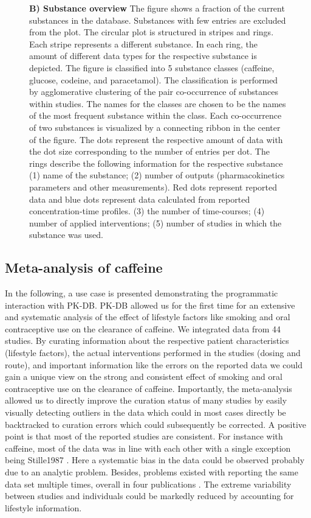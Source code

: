 \documentclass[a4,center,fleqn]{NAR}
\begin{document}
\begin{figure}[t]
{\textbf{ B) Substance overview} The figure shows a fraction of the current substances in the database. Substances with few entries are excluded from the plot. The circular plot is structured in stripes and rings. Each stripe represents a different substance. In each ring, the amount of different data types for the respective substance is depicted. The figure is classified into 5 substance classes (caffeine, glucose, codeine, and paracetamol). The classification is performed by agglomerative clustering of the pair co-occurrence of substances within studies. The names for the classes are chosen to be the names of the most frequent substance within the class. Each co-occurrence of two substances is visualized by a connecting ribbon in the center of the figure. The dots represent the respective amount of data with the dot size corresponding to the number of entries per dot. The rings describe the following information for the respective substance (1) name of the substance; (2) number of outputs (pharmacokinetics parameters and other measurements). Red dots represent reported data and blue dots represent data calculated from reported concentration-time profiles. (3) the number of time-courses; (4) number of applied interventions; (5) number of studies in which the substance was used.
}
\label{NAR-fig3}
\end{figure}

\subsection{Meta-analysis of caffeine}
In the following, a use case is presented demonstrating the programmatic interaction with PK-DB.
PK-DB allowed us for the first time for an extensive and systematic analysis of the effect of lifestyle factors like smoking and oral contraceptive use on the clearance of caffeine. We integrated data from 44 studies. By curating information about the respective patient characteristics (lifestyle factors), the actual interventions performed in the studies (dosing and route), and important information like the errors on the reported data we could gain a unique view on the strong and consistent effect of smoking and oral contraceptive use on the clearance of caffeine. 
Importantly, the meta-analysis allowed us to directly improve the curation status of many studies by easily visually detecting outliers in the data which could in most cases directly be backtracked to curation errors which could subsequently be corrected. 
A positive point is that most of the reported studies are consistent. For instance with caffeine, most of the data was in line with each other with a single exception being Stille1987 \cite{Stille1987}. Here a systematic bias in the data could be observed probably due to an analytic problem. Besides, problems existed with reporting the same data set multiple times, overall in four publications \cite{Stille1987, Harder1988, Harder1989, Balogh1992}. The extreme variability between studies and individuals could be markedly reduced by accounting for lifestyle information.
\end{document}
